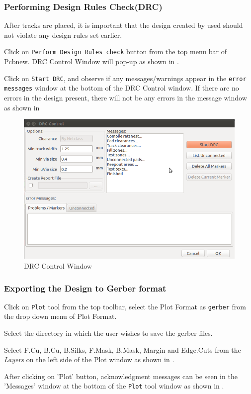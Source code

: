 \subsubsection{Performing Design Rules Check(DRC)}
\begin{compactenum}
\item After tracks are placed, it is important that the design created by used should not violate any design rules set earlier.
\item Click on \texttt{Perform Design Rules check} button from the top menu bar of Pcbnew. DRC Control Window will pop-up as shown in .
\item Click on \texttt{Start DRC}, and observe if any messages/warnings appear in the \texttt{error messages} window at the bottom of the DRC Control window. If there are no errors in the design present, there will not be any errors in the message window as shown in 
\end{compactenum}

\begin{figure}
\centering
\includegraphics[height=0.4\textwidth]{drc1.png}
\caption{DRC Control Window}
\label{DRC}
\end{figure}

\subsubsection{Exporting the Design to Gerber format}
\begin{compactenum}
\item Click on \texttt{Plot} tool from the top toolbar, select the Plot Format as \texttt{gerber} from the drop down menu of Plot Format.
\item Select the directory in which the user wishes to save the gerber files. 
\item Select F.Cu, B.Cu, B.Silks, F.Mask, B.Mask, Margin and Edge.Cuts from the \textit{Layers} on the left side of the Plot window as shown in .
\item After clicking on 'Plot' button, acknowledgment messages can be seen in the 'Messages' window at the bottom of the \texttt{Plot} tool window as shown in .
\end{compactenum}


